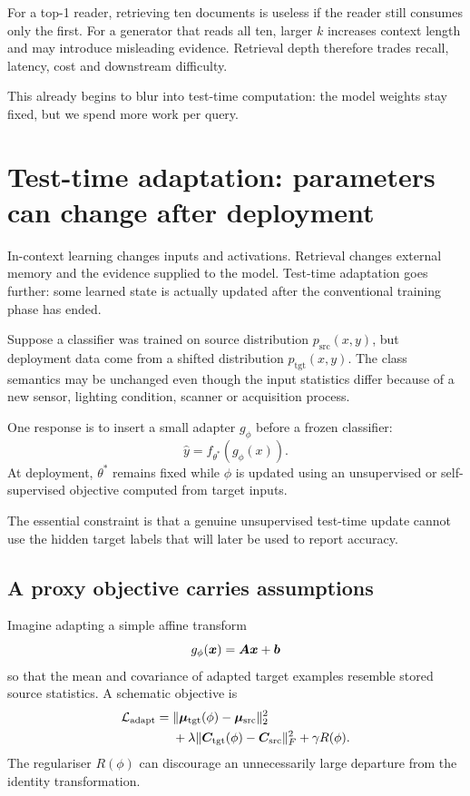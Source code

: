 For a top-1 reader, retrieving ten documents is useless if the reader still consumes only the first. For a generator that reads all ten, larger \(k\) increases context length and may introduce misleading evidence. Retrieval depth therefore trades recall, latency, cost and downstream difficulty.

This already begins to blur into test-time computation: the model weights stay fixed, but we spend more work per query.

\section{Test-time adaptation: parameters can change after deployment}

In-context learning changes inputs and activations. Retrieval changes external memory and the evidence supplied to the model. Test-time adaptation goes further: some learned state is actually updated after the conventional training phase has ended.

Suppose a classifier was trained on source distribution \(p_{\mathrm{src}}(x,y)\), but deployment data come from a shifted distribution \(p_{\mathrm{tgt}}(x,y)\). The class semantics may be unchanged even though the input statistics differ because of a new sensor, lighting condition, scanner or acquisition process.

One response is to insert a small adapter \(g_\phi\) before a frozen classifier:
\[
  \hat{y}=f_{\theta^*}(g_\phi(x)).
\]
At deployment, \(\theta^*\) remains fixed while \(\phi\) is updated using an unsupervised or self-supervised objective computed from target inputs.

The essential constraint is that a genuine unsupervised test-time update cannot use the hidden target labels that will later be used to report accuracy.

\subsection{A proxy objective carries assumptions}

Imagine adapting a simple affine transform
\[
  g_\phi(\bm{x})=\bm{A}\bm{x}+\bm{b}
\]
so that the mean and covariance of adapted target examples resemble stored source statistics. A schematic objective is
\begin{equation}
\begin{split}
  \mathcal{L}_{\mathrm{adapt}}
  ={}& \|\bm{\mu}_{\mathrm{tgt}}(\phi)-\bm{\mu}_{\mathrm{src}}\|_2^2 \\
     &+ \lambda\|\bm{C}_{\mathrm{tgt}}(\phi)-\bm{C}_{\mathrm{src}}\|_F^2
      + \gamma R(\phi).
\end{split}
\label{eq:week11-adaptation}
\end{equation}
The regulariser \(R(\phi)\) can discourage an unnecessarily large departure from the identity transformation.

